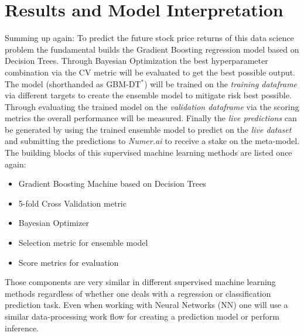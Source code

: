 \documentclass[12pt, a4paper]{article}
\begin{document}
\section{Results and Model Interpretation}
Summing up again: To predict the future stock price returns of this data science problem the fundamental builds the Gradient Boosting regression model based on Decision Trees. Through Bayesian Optimization the best hyperparameter combination via the CV metric will be evaluated to get the best possible output. The model (shorthanded as GBM-DT$^{\ast}$) will be trained on the \textit{training dataframe} via different targets to create the ensemble model to mitigate risk best possible. Through evaluating the trained model on the \textit{validation dataframe} via the scoring metrics the overall performance will be measured. Finally the \textit{live predictions} can be generated by using the trained ensemble model to predict on the \textit{live dataset} and submitting the predictions to \textit{Numer.ai} to receive a stake on the meta-model. The building blocks of this supervised machine learning methods are listed once again:
\begin{itemize}
    \item Gradient Boosting Machine based on Decision Trees
    \item 5-fold Cross Validation metric
    \item Bayesian Optimizer
    \item Selection metric for ensemble model
    \item Score metrics for evaluation
\end{itemize}
Those components are very similar in different supervised machine learning methods regardless of whether one deals with a regression or classification prediction task. Even when working with Neural Networks (NN) one will use a similar data-processing work flow for creating a prediction model or perform inference.
\end{document}
